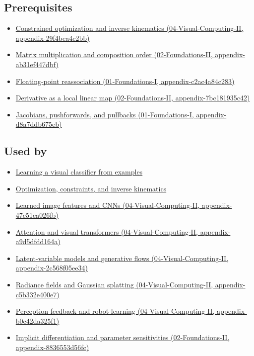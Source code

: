 \subsection{Prerequisites}\label{prerequisites}

\begin{itemize}
\tightlist
\item
  \href{}{Constrained optimization and inverse kinematics (04-Visual-Computing-II, appendix-29f4bea4c2bb)}
\item
  \href{}{Matrix multiplication and composition order (02-Foundations-II, appendix-ab31ef447dbf)}
\item
  \href{}{Floating-point reassociation (01-Foundations-I, appendix-c2ac4a84c283)}
\item
  \href{}{Derivative as a local linear map (02-Foundations-II, appendix-7bc181935c42)}
\item
  \href{}{Jacobians, pushforwards, and pullbacks (01-Foundations-I, appendix-d8a7ddb675eb)}
\end{itemize}

\subsection{Used by}\label{used-by}

\begin{itemize}
\tightlist
\item
  \href{Continuous\%20Notes/University\%20-\%20Worlds,\%20Images\%20and\%20Inference\%20-\%20Graphics,\%20Vision\%20and\%20Photography\#Learning\%20a\%20visual\%20classifier\%20from\%20examples}{Learning a visual classifier from examples}
\item
  \href{Continuous\%20Notes/University\%20-\%20Worlds,\%20Images\%20and\%20Inference\%20-\%20Graphics,\%20Vision\%20and\%20Photography\#Optimization,\%20constraints,\%20and\%20inverse\%20kinematics}{Optimization, constraints, and inverse kinematics}
\item
  \href{}{Learned image features and CNNs (04-Visual-Computing-II, appendix-47c51ea026fb)}
\item
  \href{}{Attention and visual transformers (04-Visual-Computing-II, appendix-a9d5dfdd164a)}
\item
  \href{}{Latent-variable models and generative flows (04-Visual-Computing-II, appendix-2c568f05ee34)}
\item
  \href{}{Radiance fields and Gaussian splatting (04-Visual-Computing-II, appendix-c5b332e400e7)}
\item
  \href{}{Perception feedback and robot learning (04-Visual-Computing-II, appendix-b0c42da325f1)}
\item
  \href{}{Implicit differentiation and parameter sensitivities (02-Foundations-II, appendix-8836553d56fc)}
\end{itemize}

